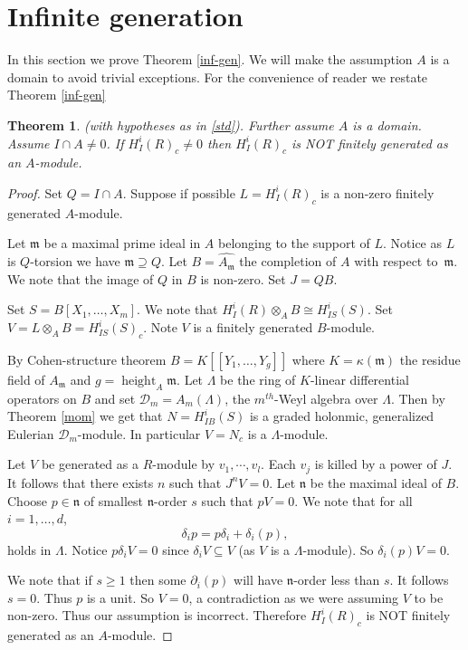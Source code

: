 \documentclass{amsart}
\newcommand{\wrt}{with respect to}
\newcommand{\D}{\mathcal{D} }
\newcommand{\n}{\mathfrak{n} }
\newcommand{\m}{\mathfrak{m} }
\newcommand{\height}{\operatorname{height}}
\theoremstyle{plain}
\newtheorem{theorem}{Theorem}[section]
\theoremstyle{definition}
\theoremstyle{remark}
\begin{document}
\section{Infinite generation}
In this section we prove Theorem \ref{inf-gen}. We will make the assumption $A$ is a domain to avoid trivial exceptions. For the convenience of reader we restate Theorem \ref{inf-gen}
\begin{theorem}\label{inf-gen-proof}(with hypotheses as in \ref{std}). Further assume $A$ is a domain. Assume $I \cap A \neq 0$. If $H^i_I(R)_c \neq 0$ then
$H^i_I(R)_c$ is NOT finitely generated as an $A$-module.
\end{theorem}
\begin{proof}
Set $Q = I \cap A$. Suppose if possible $ L = H^i_I(R)_c$ is a non-zero finitely generated $A$-module.

 Let $\m$ be a maximal prime  ideal in $A$ belonging to the support of $L$. Notice as $L$ is $Q$-torsion we have $\m \supseteq Q$. Let $B = \widehat{A_\m}$ the completion of $A$ \wrt \ $\m$. We note that the image of $Q$ in $B$ is non-zero.
 Set $J = QB$.
 
 Set $S = B[X_1,\ldots, X_m]$. We note that $H^i_I(R)\otimes_A B \cong H^i_{IS}(S)$. Set $V = L\otimes_A B = H^i_{IS}(S)_c$. Note $V$ is a finitely generated $B$-module. 
 
 
 By Cohen-structure theorem $B = K[[Y_1,\ldots, Y_g]]$ where $K = \kappa(\m)$ the residue field of $A_\m$  and $g = \height_A \m$.
 Let $\Lambda $ be the ring of $K$-linear differential operators on $B$ and set $\D_m = A_m(\Lambda)$, the $m^{th}$-Weyl algebra
 over $\Lambda$. Then by  Theorem \ref{mom} we get that $N = H^i_{IB}(S) $ is a graded holonmic, generalized Eulerian
 $\D_m$-module.  In particular $V = N_c$ is a $\Lambda$-module.
 
 Let $V$ be generated as a $R$-module by $v_1,\cdots, v_l$. Each $v_j$ is killed by a power of $J$. It follows that there exists $n$ such that $J^n V = 0$. 
 Let $\n$ be the maximal ideal of $B$. Choose $p \in \n$ of smallest $\n$-order $s$ such that $p V = 0$. We note that for all $i = 1, \ldots, d$,
 $$\delta_i p = p \delta_i  + \delta_i(p),$$
 holds in $\Lambda$.  Notice $p \delta_i V = 0$ since $\delta_i V \subseteq V$ (as $V$ is a $\Lambda$-module).  So $\delta_i(p) V = 0$.
 
 We note that if $s \geq 1$ then some $\partial_i(p)$ will have $\n$-order less than $s$. It follows $s = 0$. Thus $p$ is a unit. So $V = 0$, a contradiction as we were assuming $V$ to be non-zero.
 Thus our assumption is incorrect. Therefore $ H^i_I(R)_c$ is NOT finitely generated as an $A$-module.
\end{proof}
\end{document}

